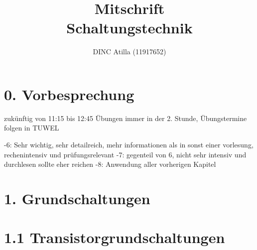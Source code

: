 \documentclass[a4paper]{article}
\title{Mitschrift\\Schaltungstechnik}
\author{DINC Atilla (11917652)}
\begin{document}
\normalsize
\maketitle


\section*{0. Vorbesprechung}

zukünftig von 11:15 bis 12:45\newline
Übungen immer in der 2. Stunde, Übungstermine folgen in TUWEL

-6: Sehr wichtig, sehr detailreich, mehr informationen als in sonst einer vorlesung, rechenintensiv und prüfungsrelevant
-7: gegenteil von 6, nicht sehr intensiv und durchlesen sollte eher reichen
-8: Anwendung aller vorherigen Kapitel


\section*{1. Grundschaltungen}
\section*{1.1 Transistorgrundschaltungen}
\end{document}
